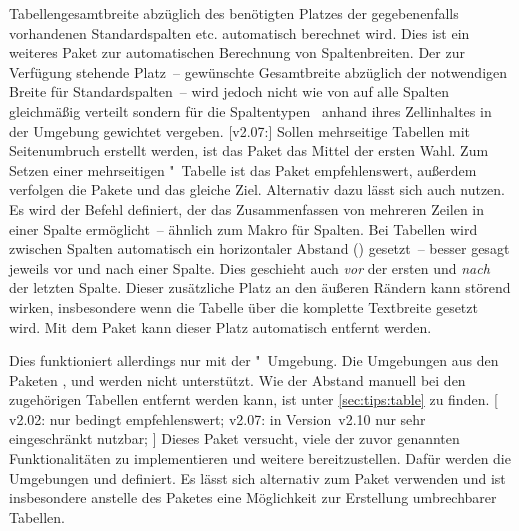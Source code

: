 \begin{DeclarePackages}
  Tabellengesamtbreite abzüglich des benötigten Platzes der gegebenenfalls 
  vorhandenen Standardspalten  etc. automatisch berechnet wird.
  Dies ist ein weiteres Paket zur automatischen Berechnung von Spaltenbreiten. 
  Der zur Verfügung stehende Platz~-- gewünschte Gesamtbreite abzüglich der 
  notwendigen Breite für Standardspalten~-- wird jedoch nicht wie von 
   auf alle Spalten gleichmäßig verteilt sondern für die 
  Spaltentypen~ anhand ihres Zellinhaltes in der Umgebung 
  gewichtet vergeben.
[v2.07:]
  Sollen mehrseitige Tabellen mit Seitenumbruch erstellt werden, ist das Paket
   das Mittel der ersten Wahl. Zum Setzen einer mehrseitigen 
  "~Tabelle ist das Paket  
  empfehlenswert, außerdem verfolgen die Pakete  und 
   das gleiche Ziel. Alternativ dazu lässt sich auch 
   nutzen.
  Es wird der Befehl  definiert, der das Zusammenfassen von 
  mehreren Zeilen in einer Spalte ermöglicht~-- ähnlich zum Makro 
   für Spalten.
  Bei Tabellen wird zwischen Spalten automatisch ein horizontaler Abstand 
  () gesetzt~-- besser gesagt jeweils vor und nach einer 
  Spalte. Dies geschieht auch \emph{vor} der ersten und \emph{nach} der letzten 
  Spalte. Dieser zusätzliche Platz an den äußeren Rändern kann störend wirken, 
  insbesondere wenn die Tabelle über die komplette Textbreite gesetzt wird. Mit 
  dem Paket  kann dieser Platz automatisch entfernt 
  werden.
  
  Dies funktioniert allerdings nur mit der "~Umgebung. 
  Die Umgebungen aus den Paketen ,  und 
   werden nicht unterstützt. Wie der Abstand manuell bei den 
  zugehörigen Tabellen entfernt werden kann, ist unter \autoref{sec:tips:table} 
  zu finden.
[%
    v2.02: nur bedingt empfehlenswert;
    v2.07: in Version~v2.10 nur sehr eingeschränkt nutzbar;
  ]%
  Dieses Paket versucht, viele der zuvor genannten Funktionalitäten zu 
  implementieren und weitere bereitzustellen. Dafür werden die Umgebungen 
   und  definiert. Es lässt sich 
  alternativ zum Paket  verwenden und ist insbesondere 
  anstelle des Paketes  eine Möglichkeit zur Erstellung 
  umbrechbarer Tabellen.
  

\end{DeclarePackages}
